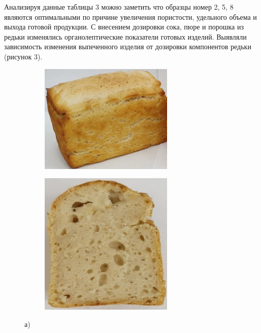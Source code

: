 Анализируя данные таблицы 3 можно заметить что образцы номер 2, 5, 8
являются оптимальными по причине увеличения пористости, удельного объема
и выхода готовой продукции. С внесением дозировки сока, пюре и порошка
из редьки изменялись органолептические показатели готовых изделий.
Выявляли зависимость изменения выпеченного изделия от дозировки
компонентов редьки (рисунок 3).

\begin{figure}[H]
	\centering
	\begin{subfigure}{0.48\textwidth}
		\centering
		\includegraphics[width=0.7\textwidth,height=0.7\textwidth]{media/pish/image61}
	\end{subfigure}
	\begin{subfigure}{0.48\textwidth}
		\centering
		\includegraphics[width=0.7\textwidth,height=0.7\textwidth]{media/pish/image62}
	\end{subfigure}
	\caption*{а)}
\end{figure}

